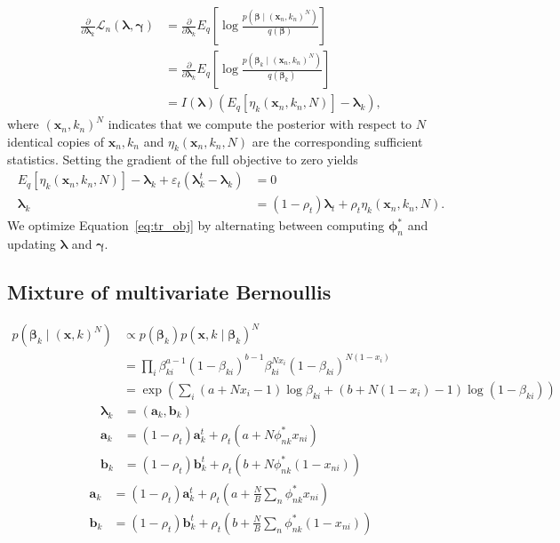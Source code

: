 \documentclass[a4paper]{article}
\begin{document}
		\begin{align}
			\frac{\partial}{\partial \bm{\lambda}_k} \mathcal{L}_n(\bm{\lambda}, \bm{\gamma})
			&= \frac{\partial}{\partial \bm{\lambda}_k} E_q\left[ \log \frac{p(\bm{\beta} \mid (\mathbf{x}_n, k_n)^N)}{q(\bm{\beta})} \right] \\
			&= \frac{\partial}{\partial \bm{\lambda}_k} E_q\left[ \log \frac{p(\bm{\beta}_k \mid (\mathbf{x}_n, k_n)^N)}{q(\bm{\beta}_k)} \right] \\
			&= I(\bm{\lambda}) (E_q\left[ \eta_k(\mathbf{x}_n, k_n, N) \right] - \bm{\lambda}_k),
		\end{align}
		where $(\mathbf{x}_n, k_n)^N$ indicates that we compute the posterior with respect to $N$ identical copies of $\mathbf{x}_n, k_n$
		and $\eta_k(\mathbf{x}_n, k_n, N)$ are the corresponding sufficient statistics. Setting the gradient of the full objective to zero yields
		\begin{align}
			E_q\left[ \eta_k(\mathbf{x}_n, k_n, N) \right] - \bm{\lambda}_k + \varepsilon_t (\bm{\lambda}_k^t - \bm{\lambda}_k) &= 0 \\
			\bm{\lambda}_k &= (1 - \rho_t) \bm{\lambda}_t + \rho_t \eta_k(\mathbf{x}_n, k_n, N).
		\end{align}
		We optimize Equation~\ref{eq:tr_obj} by alternating between computing $\bm{\phi}_n^*$ and updating $\bm{\lambda}$ and $\bm{\gamma}$.

		\subsection*{Mixture of multivariate Bernoullis}
			\begin{align}
				p(\bm{\beta}_k \mid (\mathbf{x}, k)^N )
				&\propto p(\bm{\beta}_k) p(\mathbf{x}, k \mid \bm{\beta}_k)^N \\
				&= \prod_i \beta_{ki}^{a - 1}(1 - \beta_{ki})^{b - 1} \beta_{ki}^{Nx_i} (1 - \beta_{ki})^{N(1 - x_i)} \\
				&= \exp\left( \sum_i (a + N x_i - 1) \log \beta_{ki} + (b + N(1 - x_i) - 1) \log(1 - \beta_{ki}) \right)
			\end{align}
			\begin{align}
				\bm{\lambda}_k &= (\mathbf{a}_k, \mathbf{b}_k) \\
				\mathbf{a}_k &= (1 - \rho_t) \mathbf{a}_k^t + \rho_t (a + N \phi_{nk}^* x_{ni}) \\
				\mathbf{b}_k &= (1 - \rho_t) \mathbf{b}_k^t + \rho_t (b + N \phi_{nk}^* (1 - x_{ni}))
			\end{align}
			\begin{align}
				\mathbf{a}_k &= (1 - \rho_t) \mathbf{a}_k^t + \rho_t \left(a + \frac{N}{B} \sum_n \phi_{nk}^* x_{ni}\right) \\
				\mathbf{b}_k &= (1 - \rho_t) \mathbf{b}_k^t + \rho_t \left(b + \frac{N}{B} \sum_n \phi_{nk}^* (1 - x_{ni})\right)
			\end{align}
\end{document}
